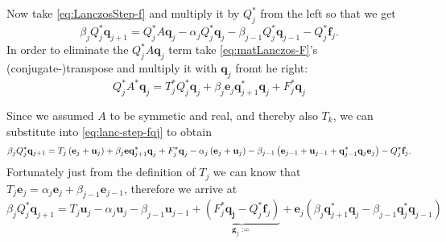 \documentclass{article}
\begin{document}
Now take \autoref{eq:LanczosStep-f} and multiply it by $Q_j^\ast$ from the left so that we get 
\begin{equation}\label{eq:lanc-step-fqj}
	\beta_jQ_j^\ast\mathbf{q}_{j+1}=Q_j^\ast A\mathbf{q}_j-\alpha_jQ_j^\ast\mathbf{q}_j-\beta_{j-1}Q_j^\ast\mathbf{q}_{j-1} - Q_j^\ast\textbf{f}_j.
\end{equation}
In order to eliminate the $Q_j^\ast A\mathbf{q}_j$ term take \autoref{eq:matLanczos-F}'s (conjugate-)transpose and multiply it with $\textbf{q}_j$ fromt he right:
\begin{equation}
	Q_{j}^\ast A^\ast \textbf{q}_j  =T_j^\ast Q_j^\ast \textbf{q}_j +\beta_{j}\mathbf{e}_j\mathbf{q}_{j+1}^{\ast}\textbf{q}_j + F_j^\ast \textbf{q}_j
\end{equation} 

Since we assumed $A$ to be symmetic and real, and thereby also $T_k$, we can substitute into \autoref{eq:lanc-step-fqj} to obtain
\begin{equation*}
	\beta_jQ_j^\ast\mathbf{q}_{j+1}=T_j \left({\bf e}_j+ {\bf u}_j\right) +\beta_{j}\mathbf{e}\mathbf{q}_{j+1}^{\ast}\textbf{q}_j + F_j^\ast \textbf{q}_j-\alpha_j \left({\bf e}_j+ {\bf u}_j\right)-\beta_{j-1}\left({\bf e}_{j-1}+ {\bf u}_{j-1} + {\bf q}_{j-1}^\ast {\bf q}_j {\bf e}_j\right) - Q_j^\ast\textbf{f}_j.
\end{equation*}
Fortunately just from the definition of $T_j$ we can know that $T_j \textbf{e}_j = \alpha_{j} \textbf{e}_j + \beta_{j-1} \textbf{e}_{j-1}$, therefore we arrive at
\begin{equation}\label{eq:error-accum}
	\beta_jQ_{j}^{\ast}\mathbf{q}_{j+1}=T_{j}\mathbf{u}_j-\alpha_j\mathbf{u}_j-\beta_{j-1}\mathbf{u}_{j-1}+\underbrace{(F_j^{\ast}\mathbf{q_j}-Q_j^{\ast}\mathbf{f}_j)}_{\mathbf{g}_j:=}+\mathbf{e}_j(\beta_{j}\mathbf{q}_{j+1}^{\ast}\mathbf{q}_{j}-\beta_{j-1}\mathbf{q}_{j}^{\ast}\mathbf{q}_{j-1})
\end{equation}
\end{document}

